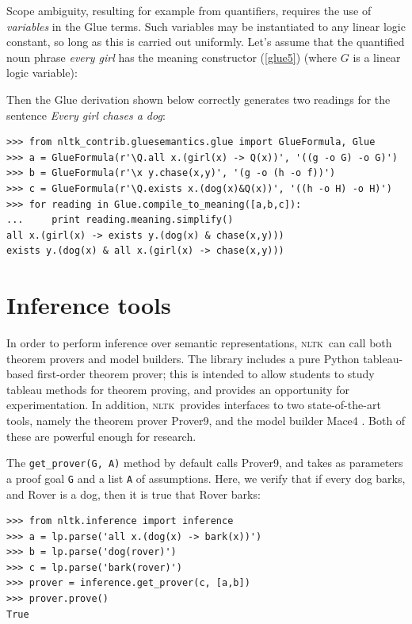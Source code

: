 \documentclass[11pt,a4paper]{article}
\newcommand{\NLTK}{\textsc{nltk}}
\begin{document}
Scope ambiguity, resulting for example from quantifiers, requires the
use of \textit{variables} in the Glue terms. Such variables may be
instantiated to any linear logic constant, so long as this is carried
out uniformly. Let's assume that the quantified noun phrase
\textit{every girl} has the meaning constructor (\ref{glue5}) (where
$G$ is a linear logic variable):

Then the Glue derivation shown below correctly
generates two readings for the sentence \textit{Every girl chases a dog}:
\begin{verbatim}
>>> from nltk_contrib.gluesemantics.glue import GlueFormula, Glue
>>> a = GlueFormula(r'\Q.all x.(girl(x) -> Q(x))', '((g -o G) -o G)')
>>> b = GlueFormula(r'\x y.chase(x,y)', '(g -o (h -o f))')
>>> c = GlueFormula(r'\Q.exists x.(dog(x)&Q(x))', '((h -o H) -o H)')
>>> for reading in Glue.compile_to_meaning([a,b,c]):
...     print reading.meaning.simplify()
all x.(girl(x) -> exists y.(dog(x) & chase(x,y)))
exists y.(dog(x) & all x.(girl(x) -> chase(x,y)))
\end{verbatim}


\section{Inference tools}
In order to perform inference over semantic representations, \NLTK\
can call both theorem provers and model builders.
The library includes a pure Python tableau-based first-order theorem prover;
this is intended to allow students to study 
tableau methods for theorem proving, and provides an
opportunity for experimentation.  In addition, \NLTK\ provides
interfaces to two state-of-the-art tools, namely the theorem prover Prover9, 
and the model builder Mace4  \citep{McCune}.  Both of these are
powerful enough for research.

The \verb!get_prover(G, A)! method by default calls Prover9, and takes as
parameters a proof goal \texttt{G} and a list \texttt{A} of assumptions.
Here, we verify that if every dog barks, and Rover is a dog,
then it is true that Rover barks:
\begin{verbatim}
>>> from nltk.inference import inference
>>> a = lp.parse('all x.(dog(x) -> bark(x))')
>>> b = lp.parse('dog(rover)')
>>> c = lp.parse('bark(rover)')
>>> prover = inference.get_prover(c, [a,b])
>>> prover.prove()
True
\end{verbatim}
\end{document}
